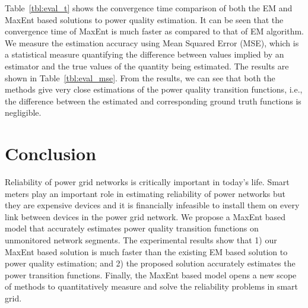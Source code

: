 Table~\ref{tbl:eval_t} shows the convergence time comparison of both the EM and MaxEnt based solutions to power quality estimation. It can be seen that the convergence time of MaxEnt is much faster as compared to that of EM algorithm. We measure the estimation accuracy using Mean Squared Error (MSE), which is a statistical measure quantifying the difference between values implied by an estimator and the true values of the quantity being estimated. The results are shown in Table~\ref{tbl:eval_mse}. From the results, we can see that both the methods give very close estimations of the power quality transition functions, i.e., the difference between the estimated and corresponding ground truth functions is negligible.


\section{Conclusion}
Reliability of power grid networks is critically important in today's life.  Smart meters play an important role in estimating reliability of power networks but they are expensive devices and it is financially infeasible to install them on every link between devices in the power grid network. We propose a MaxEnt based model that accurately estimates power quality transition functions on unmonitored network segments. The experimental results show that 1) our MaxEnt based solution is much faster than the existing EM based solution to power quality estimation; and 2) the proposed solution accurately estimates the power transition functions. Finally, the MaxEnt based model opens a new scope of methods to quantitatively measure and solve the reliability problems in smart grid.